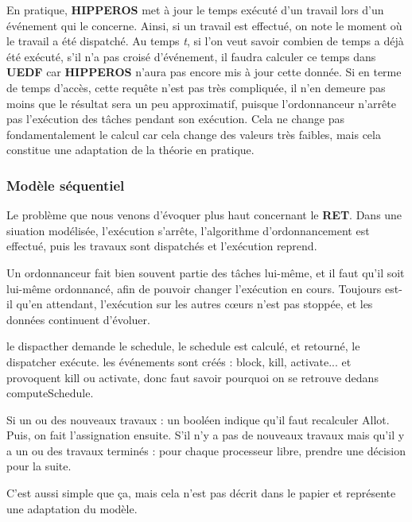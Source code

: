 		En pratique, \textbf{HIPPEROS} met à jour le temps exécuté d'un travail lors d'un événement qui le concerne. 
		Ainsi, si un travail est effectué, on note le moment où le travail a été dispatché.
		Au temps \textit{t}, si l'on veut savoir combien de temps a déjà été exécuté, 
		s'il n'a pas croisé d'événement, il faudra calculer ce temps dans \textbf{UEDF} 
		car \textbf{HIPPEROS} n'aura pas encore mis à jour cette donnée.\newline
		Si en terme de temps d'accès, cette requête n'est pas très compliquée, il n'en demeure pas moins 
		que le résultat sera un peu approximatif, puisque l'ordonnanceur n'arrête pas l'exécution des tâches pendant 
		son exécution. Cela ne change pas fondamentalement le calcul car cela change des valeurs très faibles, 
		mais cela constitue une adaptation de la théorie en pratique.\newline

	\subsubsection{Modèle séquentiel}
	
		Le problème que nous venons d'évoquer plus haut concernant le \textbf{RET}. 
		Dans une siuation modélisée, l'exécution s'arrête, l'algorithme d'ordonnancement est effectué, 
		puis les travaux sont dispatchés et l'exécution reprend.\newline
		 
		Un ordonnanceur fait bien souvent partie des tâches lui-même, et il faut qu'il soit lui-même ordonnancé, 
		afin de pouvoir changer l'exécution en cours. Toujours est-il qu'en attendant, l'exécution sur les autres cœurs 
		n'est pas stoppée, et les données continuent d'évoluer. 
		
		le dispacther demande le schedule, 
		le schedule est calculé, et retourné,
		le dispatcher exécute.
		les événements sont créés : block, kill, activate... et provoquent kill ou activate, donc faut 
		savoir pourquoi on se retrouve dedans computeSchedule.

		Si un ou des nouveaux travaux : un booléen indique qu'il faut recalculer Allot. Puis, 
		on fait l'assignation ensuite.
		S'il n'y a pas de nouveaux travaux mais qu'il y a un ou des travaux terminés :
		pour chaque processeur libre, prendre une décision pour la suite.\newline
		
		C'est aussi simple que ça, mais cela n'est pas décrit dans le papier et représente une 
		adaptation du modèle.
	
